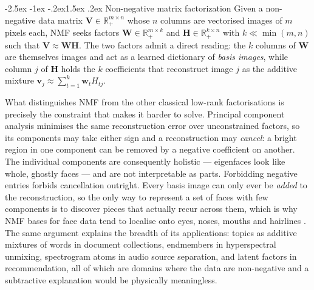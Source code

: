 \documentclass[12pt,a4paper]{article}
\makeatletter
\renewcommand\subsection{\@startsection{subsection}{2}{\z@}%
    {-2.5ex \@plus -1ex \@minus -.2ex}{1.5ex \@plus.2ex}%
    {\normalfont\fontsize{12}{14}\bfseries}}
\newcommand{\bV}{\bm{V}}
\newcommand{\bW}{\bm{W}}
\newcommand{\bH}{\bm{H}}
\newcommand{\bv}{\bm{v}}
\newcommand{\bw}{\bm{w}}
\makeatother
\begin{document}
\subsection{Non-negative matrix factorization}
Given a non-negative data matrix $\bV \in \mathbb{R}^{m \times n}_{+}$ whose
$n$ columns are vectorised images of $m$ pixels each, NMF seeks factors
$\bW \in \mathbb{R}^{m \times k}_{+}$ and $\bH \in \mathbb{R}^{k \times n}_{+}$
with $k \ll \min(m,n)$ such that $\bV \approx \bW\bH$. The two factors admit
a direct reading: the $k$ columns of $\bW$ are themselves images and act as a
learned dictionary of \emph{basis images}, while column $j$ of $\bH$ holds the
$k$ coefficients that reconstruct image $j$ as the additive mixture
$\bv_j \approx \sum_{t=1}^{k} \bw_t H_{tj}$.

What distinguishes NMF from the other classical low-rank factorisations is
precisely the constraint that makes it harder to solve. Principal component
analysis minimises the same reconstruction error over unconstrained factors,
so its components may take either sign and a reconstruction may \emph{cancel}:
a bright region in one component can be removed by a negative coefficient on
another. The individual components are consequently holistic --- eigenfaces
look like whole, ghostly faces --- and are not interpretable as parts. Forbidding
negative entries forbids cancellation outright. Every basis image can only ever
be \emph{added} to the reconstruction, so the only way to represent a set of
faces with few components is to discover pieces that actually recur across
them, which is why NMF bases for face data tend to localise onto eyes, noses,
mouths and hairlines \citep{lee1999learning}. The same argument explains the
breadth of its applications: topics as additive mixtures of words in document
collections, endmembers in hyperspectral unmixing, spectrogram atoms in audio
source separation, and latent factors in recommendation, all of which are
domains where the data are non-negative and a subtractive explanation would be
physically meaningless.
\end{document}
